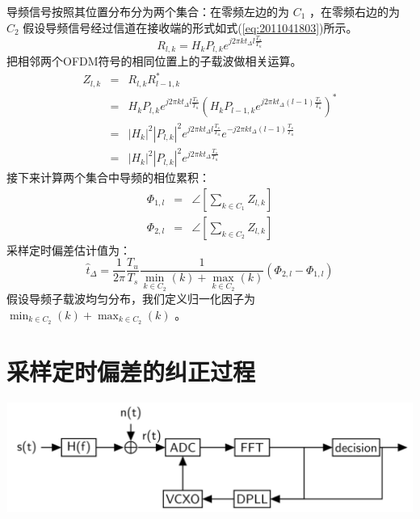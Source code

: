 \documentclass[10pt,a4paper,UTF8]{article}
\begin{document}
导频信号按照其位置分布分为两个集合：在零频左边的为 \(C_1\) ，在零频右边的为 \(C_2\) 假设导频信号经过信道在接收端的形式如式(\ref{eq:2011041803})所示。
\begin{equation}
  \label{eq:2011041803}
  R_{l,k} = H_kP_{l,k}e^{j2\pi k t_{\Delta}l\frac{T_s}{T_u}}
\end{equation}
把相邻两个OFDM符号的相同位置上的子载波做相关运算。
\begin{eqnarray}
  \label{eq:2011041804}
  Z_{l,k} &=& R_{l,k}R_{l-1,k}^* \\
        &=& H_kP_{l,k}e^{j2\pi k t_{\Delta}l\frac{T_s}{T_u}} (H_kP_{l-1,k}e^{j2\pi k t_{\Delta}(l-1)\frac{T_s}{T_u}})^* \\
        &=& |H_k|^2|P_{l,k}|^2 e^{j2\pi k t_{\Delta}l\frac{T_s}{T_u}}e^{-j2\pi k t_{\Delta}(l-1)\frac{T_s}{T_u}}\\
        &=& |H_k|^2|P_{l,k}|^2 e^{j2\pi k t_{\Delta}\frac{T_s}{T_u}}
\end{eqnarray}
接下来计算两个集合中导频的相位累积：
\begin{eqnarray}
  \label{eq:2011041805}
  \Phi_{1,l} &=& \angle [\sum_{k\in C_1} Z_{l,k}] \\
  \Phi_{2,l} &=& \angle [\sum_{k\in C_2} Z_{l,k}]
\end{eqnarray}
采样定时偏差估计值为：
\begin{equation}
  \label{eq:2011041806}
  \hat{t}_{{\Delta}} = \frac{1}{2\pi} \frac{T_u}{T_s} \frac{1}{\min_{k\in C_2}(k) + \max_{k\in C_2}(k)}(\Phi_{2,l}- \Phi_{1,l})
\end{equation}
假设导频子载波均匀分布，我们定义归一化因子为 \(\min_{k\in C_2}(k) + \max_{k\in C_2}(k)\) 。\\

\section{采样定时偏差的纠正过程}
\label{sec:orgc83b123}


\begin{center}
\includegraphics[width=.9\linewidth]{../../img/communication_protocol/20171018samplingTimingA.png}
\end{center}
\end{document}
